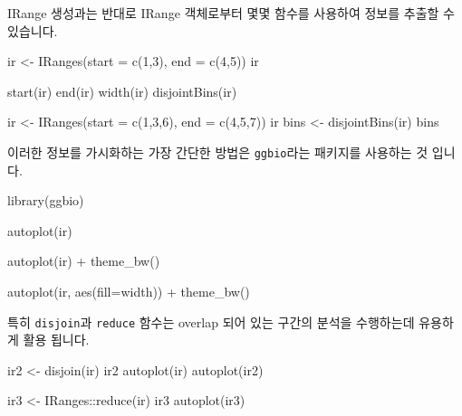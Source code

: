 \documentclass[
]{book}
\newenvironment{Shaded}{\begin{snugshade}}{\end{snugshade}}
\newcommand{\AttributeTok}[1]{\textcolor[rgb]{0.77,0.63,0.00}{#1}}
\newcommand{\DecValTok}[1]{\textcolor[rgb]{0.00,0.00,0.81}{#1}}
\newcommand{\FunctionTok}[1]{\textcolor[rgb]{0.00,0.00,0.00}{#1}}
\newcommand{\NormalTok}[1]{#1}
\newcommand{\OtherTok}[1]{\textcolor[rgb]{0.56,0.35,0.01}{#1}}
\newcommand{\SpecialCharTok}[1]{\textcolor[rgb]{0.00,0.00,0.00}{#1}}
\begin{document}
IRange 생성과는 반대로 IRange 객체로부터 몇몇 함수를 사용하여 정보를 추출할 수 있습니다.

\begin{Shaded}
\begin{Highlighting}[]
\NormalTok{ir }\OtherTok{\textless{}{-}} \FunctionTok{IRanges}\NormalTok{(}\AttributeTok{start =} \FunctionTok{c}\NormalTok{(}\DecValTok{1}\NormalTok{,}\DecValTok{3}\NormalTok{), }\AttributeTok{end =} \FunctionTok{c}\NormalTok{(}\DecValTok{4}\NormalTok{,}\DecValTok{5}\NormalTok{))}
\NormalTok{ir}

\FunctionTok{start}\NormalTok{(ir)}
\FunctionTok{end}\NormalTok{(ir)}
\FunctionTok{width}\NormalTok{(ir)}
\FunctionTok{disjointBins}\NormalTok{(ir)}

\NormalTok{ir }\OtherTok{\textless{}{-}} \FunctionTok{IRanges}\NormalTok{(}\AttributeTok{start =} \FunctionTok{c}\NormalTok{(}\DecValTok{1}\NormalTok{,}\DecValTok{3}\NormalTok{,}\DecValTok{6}\NormalTok{), }\AttributeTok{end =} \FunctionTok{c}\NormalTok{(}\DecValTok{4}\NormalTok{,}\DecValTok{5}\NormalTok{,}\DecValTok{7}\NormalTok{))}
\NormalTok{ir}
\NormalTok{bins }\OtherTok{\textless{}{-}} \FunctionTok{disjointBins}\NormalTok{(ir)}
\NormalTok{bins}
\end{Highlighting}
\end{Shaded}

이러한 정보를 가시화하는 가장 간단한 방법은 \texttt{ggbio}라는 패키지를 사용하는 것 입니다.

\begin{Shaded}
\begin{Highlighting}[]
\FunctionTok{library}\NormalTok{(ggbio)}

\FunctionTok{autoplot}\NormalTok{(ir) }

\FunctionTok{autoplot}\NormalTok{(ir) }\SpecialCharTok{+} 
  \FunctionTok{theme\_bw}\NormalTok{()}

\FunctionTok{autoplot}\NormalTok{(ir, }\FunctionTok{aes}\NormalTok{(}\AttributeTok{fill=}\NormalTok{width)) }\SpecialCharTok{+}
  \FunctionTok{theme\_bw}\NormalTok{()}
\end{Highlighting}
\end{Shaded}

특히 \texttt{disjoin}과 \texttt{reduce} 함수는 overlap 되어 있는 구간의 분석을 수행하는데 유용하게 활용 됩니다.

\begin{Shaded}
\begin{Highlighting}[]
\NormalTok{ir2 }\OtherTok{\textless{}{-}} \FunctionTok{disjoin}\NormalTok{(ir)}
\NormalTok{ir2}
\FunctionTok{autoplot}\NormalTok{(ir)}
\FunctionTok{autoplot}\NormalTok{(ir2) }

\NormalTok{ir3 }\OtherTok{\textless{}{-}}\NormalTok{ IRanges}\SpecialCharTok{::}\FunctionTok{reduce}\NormalTok{(ir)}
\NormalTok{ir3}
\FunctionTok{autoplot}\NormalTok{(ir3) }
\end{Highlighting}
\end{Shaded}
\end{document}
